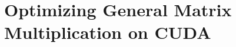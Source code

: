 \documentclass[main.tex]{subfiles}
\begin{document}
\section{Optimizing \textbf{Ge}neral \textbf{M}atrix \textbf{M}ultiplication on CUDA}





\end{document}
